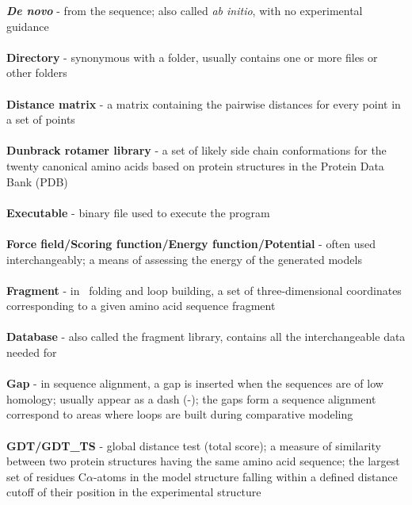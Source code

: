 \textbf{\textit{De novo}} - from the sequence; also called \textit{ab initio}, with no experimental guidance \\ \\

\textbf{Directory} - synonymous with a folder, usually contains one or more files or other folders \\ \\

\textbf{Distance matrix} - a matrix containing the pairwise distances for every point in a set of points \\ \\

\textbf{Dunbrack rotamer library} - a set of likely side chain conformations for the twenty canonical amino acids based on protein structures in the Protein Data Bank (PDB) \\ \\

\textbf{Executable} - binary file used to execute the program \\ \\

\textbf{Force field/Scoring function/Energy function/Potential} - often used interchangeably; a means of assessing the energy of the generated models \\ \\

\textbf{Fragment} - in \rosetta~folding and loop building, a set of three-dimensional coordinates corresponding to a given amino acid sequence fragment \\ \\

\textbf{Database} - also called the fragment library, contains all the interchangeable data needed for \rosetta \\ \\

\textbf{Gap} - in sequence alignment, a gap is inserted when the sequences are of low homology; usually appear as a dash (-); the gaps form a sequence alignment correspond to areas where loops are
built during comparative modeling \\ \\

\textbf{GDT/GDT\_TS} - global distance test (total score); a measure of similarity between two protein structures having the same amino acid sequence; the largest set of residues C$\alpha$-atoms in the model structure falling within a defined distance cutoff of their position in the experimental structure \\ \\

